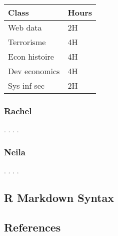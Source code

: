 \documentclass[]{article}
\begin{document}
\begin{longtable}[]{@{}ll@{}}
\toprule
\begin{minipage}[b]{0.21\columnwidth}\raggedright\strut
Class\strut
\end{minipage} & \begin{minipage}[b]{0.21\columnwidth}\raggedright\strut
Hours\strut
\end{minipage}\tabularnewline
\midrule
\endhead
\begin{minipage}[t]{0.21\columnwidth}\raggedright\strut
Web data\strut
\end{minipage} & \begin{minipage}[t]{0.21\columnwidth}\raggedright\strut
2H\strut
\end{minipage}\tabularnewline
\begin{minipage}[t]{0.21\columnwidth}\raggedright\strut
Terrorisme\strut
\end{minipage} & \begin{minipage}[t]{0.21\columnwidth}\raggedright\strut
4H\strut
\end{minipage}\tabularnewline
\begin{minipage}[t]{0.21\columnwidth}\raggedright\strut
Econ histoire\strut
\end{minipage} & \begin{minipage}[t]{0.21\columnwidth}\raggedright\strut
4H\strut
\end{minipage}\tabularnewline
\begin{minipage}[t]{0.21\columnwidth}\raggedright\strut
Dev economics\strut
\end{minipage} & \begin{minipage}[t]{0.21\columnwidth}\raggedright\strut
4H\strut
\end{minipage}\tabularnewline
\begin{minipage}[t]{0.21\columnwidth}\raggedright\strut
Sys inf sec\strut
\end{minipage} & \begin{minipage}[t]{0.21\columnwidth}\raggedright\strut
2H\strut
\end{minipage}\tabularnewline
\bottomrule
\end{longtable}

\subsubsection{Rachel}\label{rachel}

. . . .

\subsubsection{Neila}\label{neila}

. . . .

\subsection{R Markdown Syntax}\label{r-markdown-syntax}

\subsection{References}\label{references}
\end{document}
